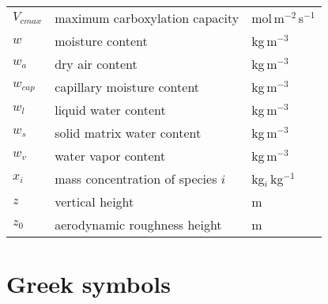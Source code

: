 \begin{longtable}{p{}p{}p{}}
	$V_{\textit{cmax}}$ & maximum carboxylation capacity & mol\,m$^{-2}$\,s$^{-1}$ \\ 

	$w$ & moisture content & kg\,m$^{-3}$ \\ 
	$w_a$ & dry air content & kg\,m$^{-3}$ \\ 	

	$w_{\textit{cap}}$ & capillary moisture content & kg\,m$^{-3}$ \\ 
	$w_l$ & liquid water content & kg\,m$^{-3}$ \\ 		
	$w_s$ & solid matrix water content & kg\,m$^{-3}$ \\ 
	$w_v$ & water vapor content & kg\,m$^{-3}$ \\ 		
	$x_i$ & mass concentration of species $i$ & kg$_i$\,kg$^{-1}$ \\ 	
	$z$ & vertical height & m \\ 	
	$z_0$ & aerodynamic roughness height & m \\ 		
\end{longtable}
\vfill
\bigskip
\section*{Greek symbols}


